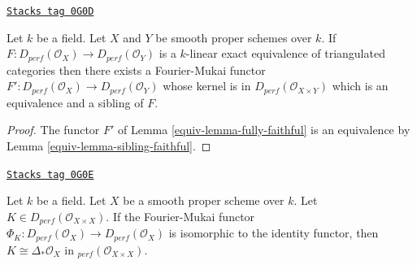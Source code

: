 \begin{proposition}[Equivalence]
\label{equiv-proposition-equivalence}
\href{https://stacks.math.columbia.edu/tag/0G0D}{\texttt{Stacks tag 0G0D}}

Let $k$ be a field. Let $X$ and $Y$ be smooth proper schemes over $k$.
If $F : D_{perf}(\mathcal{O}_X) \to D_{perf}(\mathcal{O}_Y)$
is a $k$-linear exact equivalence of triangulated categories then
there exists a Fourier-Mukai functor
$F' : D_{perf}(\mathcal{O}_X) \to D_{perf}(\mathcal{O}_Y)$ whose
kernel is in $D_{perf}(\mathcal{O}_{X \times Y})$
which is an equivalence and a sibling of $F$.
\end{proposition}

\begin{proof}

The functor $F'$ of Lemma \ref{equiv-lemma-fully-faithful}
is an equivalence by Lemma \ref{equiv-lemma-sibling-faithful}.
\end{proof}

\begin{lemma}[Uniqueness]
\label{equiv-lemma-uniqueness}
\href{https://stacks.math.columbia.edu/tag/0G0E}{\texttt{Stacks tag 0G0E}}

Let $k$ be a field. Let $X$ be a smooth proper scheme over $k$.
Let $K \in D_{perf}(\mathcal{O}_{X \times X})$. If the Fourier-Mukai
functor $\Phi_K : D_{perf}(\mathcal{O}_X) \to D_{perf}(\mathcal{O}_X)$
is isomorphic to the identity functor, then
$K \cong \Delta_*\mathcal{O}_X$ in $_{perf}(\mathcal{O}_{X \times X})$.
\end{lemma}

